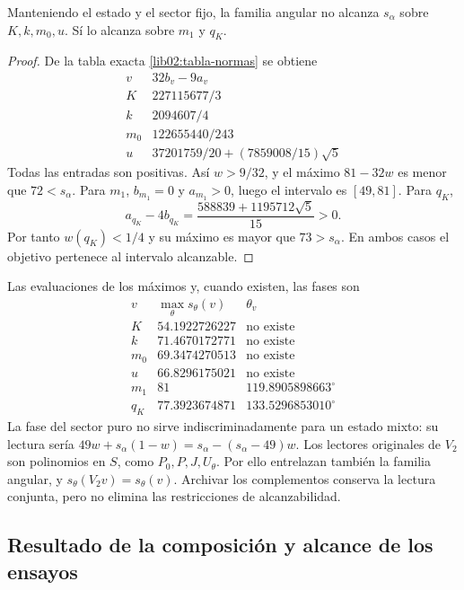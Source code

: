\begin{corollary}
\label{lib02:seis-angulares}
Manteniendo el estado y el sector fijo, la familia angular no alcanza
\(s_\alpha\) sobre \(K,k,m_0,u\). Sí lo alcanza sobre
\(m_1\) y \(q_K\).
\end{corollary}
\begin{proof}
De la tabla exacta \eqref{lib02:tabla-normas} se obtiene
\[
\begin{array}{c|c}
 v&32b_v-9a_v\\\hline
 K&227115677/3\\
 k&2094607/4\\
 m_0&122655440/243\\
 u&37201759/20+(7859008/15)\sqrt5
\end{array}
\]
Todas las entradas son positivas. Así \(w>9/32\), y el máximo
\(81-32w\) es menor que \(72<s_\alpha\). Para \(m_1\),
\(b_{m_1}=0\) y \(a_{m_1}>0\), luego el intervalo es
\([49,81]\). Para \(q_K\),
\[
 a_{q_K}-4b_{q_K}=\frac{588839+1195712\sqrt5}{15}>0.
\]
Por tanto \(w(q_K)<1/4\) y su máximo es mayor que
\(73>s_\alpha\). En ambos casos el objetivo pertenece al
intervalo alcanzable.
\end{proof}

Las evaluaciones de los máximos y, cuando existen, las fases son
\[
\begin{array}{c|c|c}
 v&\max_\theta s_\theta(v)&\theta_v\\\hline
 K&54.1922726227&\text{no existe}\\
 k&71.4670172771&\text{no existe}\\
 m_0&69.3474270513&\text{no existe}\\
 u&66.8296175021&\text{no existe}\\
 m_1&81&119.8905898663^\circ\\
 q_K&77.3923674871&133.5296853010^\circ
\end{array}
\]
La fase del sector puro no sirve indiscriminadamente para un estado
mixto: su lectura sería
\(49w+s_\alpha(1-w)=s_\alpha-(s_\alpha-49)w\).
Los lectores originales de \(V_2\) son polinomios en \(S\), como
\(P_0,P,J,U_\theta\). Por ello entrelazan también la familia
angular, y \(s_\theta(V_2v)=s_\theta(v)\). Archivar los
complementos conserva la lectura conjunta, pero no elimina las
restricciones de alcanzabilidad.

\subsection{Resultado de la composición y alcance de los ensayos}
\label{lib02:alcance}

